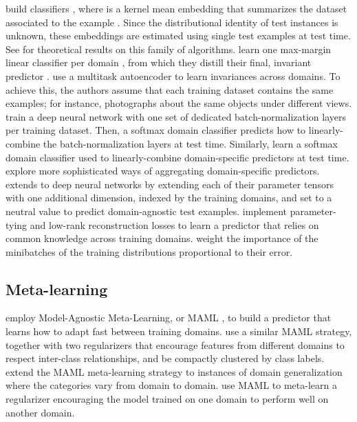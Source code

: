 \documentclass{article}
\begin{document}
\citet{blanchard2011generalizing} build classifiers , where  is a kernel mean embedding \citep{muandet2017kernel} that summarizes the dataset associated to the example . Since the distributional identity of test instances is unknown, these embeddings are estimated using single test examples at test time. See \citet{blanchard2017domain, deshmukh2019generalization} for theoretical results on this family of algorithms.
\citet{khosla2012undoing} learn one max-margin linear classifier  per domain , from which they distill their final, invariant predictor .
\citet{ghifary2015domain} use a multitask autoencoder to learn invariances across domains. To achieve this, the authors assume that each training dataset contains the same examples; for instance, photographs about the same objects under different views.
\citet{mancini2018robust} train a deep neural network with one set of dedicated batch-normalization layers \citep{ioffe2015batch} per training dataset. Then, a softmax domain classifier predicts how to linearly-combine the batch-normalization layers at test time.
Similarly, \citet{mancini2018best} learn a softmax domain classifier used to linearly-combine domain-specific predictors at test time.
\citet{d2018domain} explore more sophisticated ways of aggregating domain-specific predictors. 
\citet{Li_2017_ICCV} extends \citet{khosla2012undoing} to deep neural networks by extending each of their parameter tensors with one additional dimension, indexed by the training domains, and set to a neutral value to predict domain-agnostic test examples.
\citet{ding2017deep} implement parameter-tying and low-rank reconstruction losses to learn a predictor that relies on common knowledge across training domains.
\citet{hu2016does, sagawa2019distributionally} weight the importance of the minibatches of the training distributions proportional to their error.

\subsection{Meta-learning}

\citet{li2018learning} employ Model-Agnostic Meta-Learning, or MAML \citep{finn2017model}, to build a predictor that learns how to adapt fast between training domains.
\citet{dou2019domain} use a similar MAML strategy, together with two regularizers that encourage  features from different domains to respect inter-class relationships, and be compactly clustered by class labels.
\citet{li2019feature} extend the MAML meta-learning strategy to instances of domain generalization where the categories vary from domain to domain.
\citet{balaji2018metareg} use MAML to meta-learn a regularizer encouraging the model trained on one domain to perform well on another domain.
\end{document}
